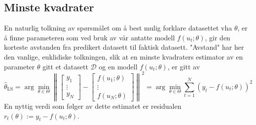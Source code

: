 \subsection{Minste kvadrater}
En naturlig tolkning av spørsmålet om å best mulig forklare datasettet vha $\theta$, er å finne parameteren som ved bruk av vår antatte modell $f(u_t; \theta)$, gir den korteste avstanden fra predikert datasett til faktisk datasett. "Avstand" har her den vanlige, euklidiske tolkningen, slik at en minste kvadraters estimator av en parameter $\theta$ gitt et datasett $\mathcal{D}$ og en modell $f(u_t; \theta)$, er gitt av
\begin{equation}
\widehat{\theta}_{\mathrm{LS}}=\arg \min _{\theta \in \Theta}\left\|\left[\begin{array}{c}
{y_{1}} \\
{\vdots} \\
{y_{N}}
\end{array}\right]-\left[\begin{array}{c}
{f\left(u_{1} ; \theta\right)} \\
{\vdots} \\
{f\left(u_{N} ; \theta\right)}
\end{array}\right]\right\|^{2}=\arg \min _{\theta \in \Theta} \sum_{t=1}^{N}\left(y_{t}-f\left(u_{t} ; \theta\right)\right)^{2}
\end{equation}
En nyttig verdi som følger av dette estimatet er residualen $r_{t}(\theta):=y_{t}-f\left(u_{t} ; \theta\right)$.

